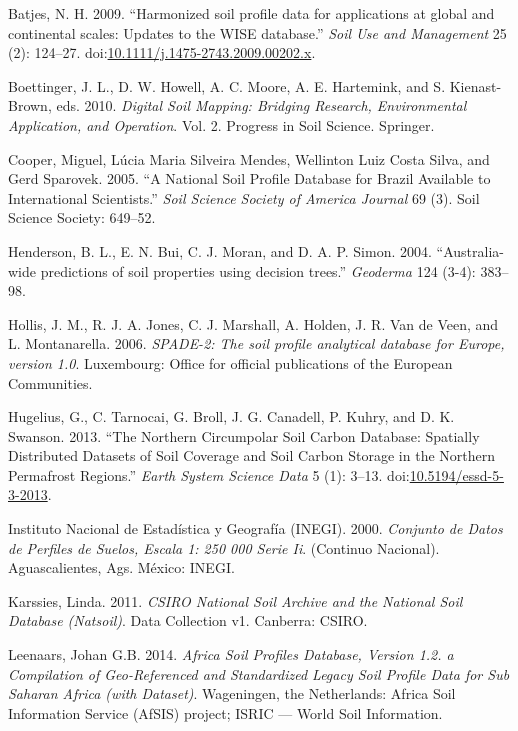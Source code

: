 \documentclass[graybox,natbib,nospthms]{svmono}
\begin{document}
\hypertarget{refs}{}
\hypertarget{ref-Batjes2009SUM}{}
Batjes, N. H. 2009. ``Harmonized soil profile data for applications at
global and continental scales: Updates to the WISE database.''
\emph{Soil Use and Management} 25 (2): 124--27.
doi:\href{https://doi.org/10.1111/j.1475-2743.2009.00202.x}{10.1111/j.1475-2743.2009.00202.x}.

\hypertarget{ref-Boettinger2010Springer}{}
Boettinger, J. L., D. W. Howell, A. C. Moore, A. E. Hartemink, and S.
Kienast-Brown, eds. 2010. \emph{Digital Soil Mapping: Bridging Research,
Environmental Application, and Operation}. Vol. 2. Progress in Soil
Science. Springer.

\hypertarget{ref-cooper2005national}{}
Cooper, Miguel, Lúcia Maria Silveira Mendes, Wellinton Luiz Costa Silva,
and Gerd Sparovek. 2005. ``A National Soil Profile Database for Brazil
Available to International Scientists.'' \emph{Soil Science Society of
America Journal} 69 (3). Soil Science Society: 649--52.

\hypertarget{ref-Henderson2004Geoderma}{}
Henderson, B. L., E. N. Bui, C. J. Moran, and D. A. P. Simon. 2004.
``Australia-wide predictions of soil properties using decision trees.''
\emph{Geoderma} 124 (3-4): 383--98.

\hypertarget{ref-hollis2006spade}{}
Hollis, J. M., R. J. A. Jones, C. J. Marshall, A. Holden, J. R. Van de
Veen, and L. Montanarella. 2006. \emph{SPADE-2: The soil profile
analytical database for Europe, version 1.0}. Luxembourg: Office for
official publications of the European Communities.

\hypertarget{ref-essd-5-3-2013}{}
Hugelius, G., C. Tarnocai, G. Broll, J. G. Canadell, P. Kuhry, and D. K.
Swanson. 2013. ``The Northern Circumpolar Soil Carbon Database:
Spatially Distributed Datasets of Soil Coverage and Soil Carbon Storage
in the Northern Permafrost Regions.'' \emph{Earth System Science Data} 5
(1): 3--13.
doi:\href{https://doi.org/10.5194/essd-5-3-2013}{10.5194/essd-5-3-2013}.

\hypertarget{ref-INEGI2000}{}
Instituto Nacional de Estadística y Geografía (INEGI). 2000.
\emph{Conjunto de Datos de Perfiles de Suelos, Escala 1: 250 000 Serie
Ii}. (Continuo Nacional). Aguascalientes, Ags. México: INEGI.

\hypertarget{ref-Karssies2011CSIRO}{}
Karssies, Linda. 2011. \emph{CSIRO National Soil Archive and the
National Soil Database (Natsoil)}. Data Collection v1. Canberra: CSIRO.

\hypertarget{ref-Leenaars2012}{}
Leenaars, Johan G.B. 2014. \emph{Africa Soil Profiles Database, Version
1.2. a Compilation of Geo-Referenced and Standardized Legacy Soil
Profile Data for Sub Saharan Africa (with Dataset)}. Wageningen, the
Netherlands: Africa Soil Information Service (AfSIS) project; ISRIC ---
World Soil Information.
\end{document}

